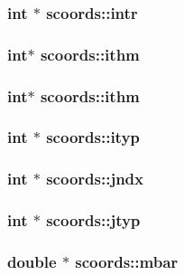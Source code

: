 \subsubsection{\setlength{\rightskip}{0pt plus 5cm}int $\ast$ {\bf scoords::intr}}\label{structscoords_501f0c1a0e2537020146aad72568ef57}


\subsubsection{\setlength{\rightskip}{0pt plus 5cm}int$\ast$ {\bf scoords::ithm}}\label{structscoords_76bd201457869286b92f9fa1246591a6}


\subsubsection{\setlength{\rightskip}{0pt plus 5cm}int$\ast$ {\bf scoords::ithm}}\label{structscoords_76bd201457869286b92f9fa1246591a6}


\subsubsection{\setlength{\rightskip}{0pt plus 5cm}int $\ast$ {\bf scoords::ityp}}\label{structscoords_5130bee1e3daeed77fc97e36ecef0dd2}


\subsubsection{\setlength{\rightskip}{0pt plus 5cm}int $\ast$ {\bf scoords::jndx}}\label{structscoords_40d1fdefd2a37b319304b537c2579652}


\subsubsection{\setlength{\rightskip}{0pt plus 5cm}int $\ast$ {\bf scoords::jtyp}}\label{structscoords_c612a556b4daa3455db327f4cc492b9b}


\subsubsection{\setlength{\rightskip}{0pt plus 5cm}double $\ast$ {\bf scoords::mbar}}\label{structscoords_3b474d4fc58224f15cd88580702bc165}


